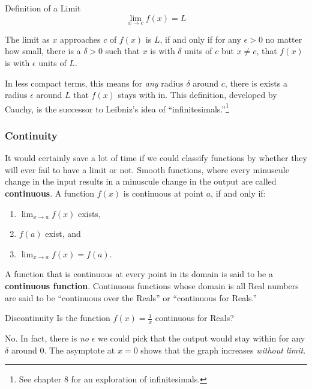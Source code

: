 \begin{derivation}{Definition of a Limit}
$$\lim_{x\rightarrow c} f(x)=L$$


The limit as $x$ approaches $c$ of $f(x)$ is $L$, if and only if
for any $\epsilon>0$ no matter how small, there is a $\delta>0$ such that
$x$ is with $\delta$ units of $c$ but $x\ne c$, that $f(x)$ is with $\epsilon$ units of $L$.
\end{derivation}



In less compact terms, this means for \emph{any} radius $\delta$ around $c$, there is exists
a radius $\epsilon$ around $L$ that $f(x)$ stays with in.  This definition, developed by
Cauchy, is the successor to Leibniz's idea of ``infinitesimals.''\footnote{
See chapter 8 for an exploration of infinitesimals.\cite{Alexander12}}


\subsubsection{Continuity}
It would certainly save a lot of time if we could classify functions by whether they will
ever fail to have a limit or not.  Smooth functions, where every minuscule change in the
input results in a minuscule change in the output are called \textbf{continuous}.  A function
$f(x)$ is continuous at point $a$, if and only if:
\begin{enumerate}
\item $\displaystyle \lim_{x\rightarrow a} f(x)$ exists,
\item $f(a)$ exist, and
\item $\displaystyle \lim_{x\rightarrow a} f(x) = f(a)$.
\end{enumerate}
A function that is continuous at every point in its domain is said to be a \textbf{continuous
function}.  Continuous functions whose domain is all Real numbers are said to be ``continuous
over the Reals'' or ``continuous for Reals.''


\begin{example}{Discontinuity}
	\exProblem
Is the function $f(x)=\frac{1}{x}$ continuous for Reals?

	\exSolution
No.  In fact, there is \emph{no} $\epsilon$ we could pick that the
output would stay within for any $\delta$ around 0.  The asymptote at $x=0$ shows that the
graph increases \emph{without limit}.


\end{example}


